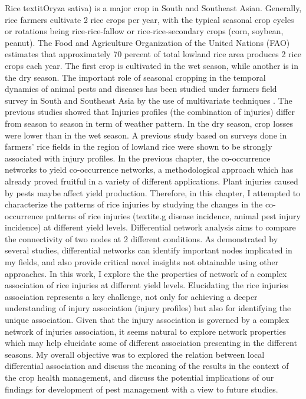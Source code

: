 Rice textit{Oryza sativa}) is a major crop in South and Southeast Asian. Generally, rice farmers cultivate 2 rice crops per year, with the typical seasonal crop cycles or rotations being rice-rice-fallow or rice-rice-secondary crops (corn, soybean, peanut). The Food and Agriculture Organization of the United Nations (FAO) estimates that approximately 70 percent of total lowland rice area produces 2 rice crops each year. The first crop is cultivated in the wet season, while another is in the dry season. The important role of seasonal cropping in the temporal dynamics of animal pests and diseases has been studied under farmers field survey in South and Southeast Asia by the use of multivariate techniques \citet{Savary_2000_Characterization, Willocquet_2008_Simulating}. The previous studies showed that Injuries profiles (the combination of injuries) differ from season to season in term of weather pattern. In the dry season, crop losses were lower than in the wet season. A previous study based on surveys done in farmers’ rice fields in the region of lowland rice were shown to be strongly associated with injury profiles.
In the previous chapter, the co-occurrence networks to yield co-occurrence networks, a methodological approach which has already proved fruitful in a variety of different applications.  Plant injuries caused by pests maybe affect yield production. Therefore, in this chapter, I attempted to characterize the patterns of rice injuries by studying the changes in the co-occurrence patterns of rice injuries (textit{e.g} disease incidence, animal pest injury incidence) at different yield levels.
Differential network analysis aims to compare the connectivity of two nodes at 2 different conditions. As demonstrated by several studies, differential networks can identify important nodes implicated in my fields, and also provide critical novel insights not obtainable using other approaches. In this work, I explore the the properties of network of a complex association of rice injuries at different yield levels. Elucidating the rice injuries association represents a key challenge, not only for achieving a deeper understanding of injury association (injury profiles) but also for identifying the unique association. Given that the injury association is governed by a complex network of injuries association, it seems natural to explore network properties which may help elucidate some of different association presenting in the different seasons.
My overall objective was to explored the relation between local differential association and discuss the meaning of the results in the context of the crop health management, and discuss the potential implications of our findings for development of pest management with a view to future studies.


